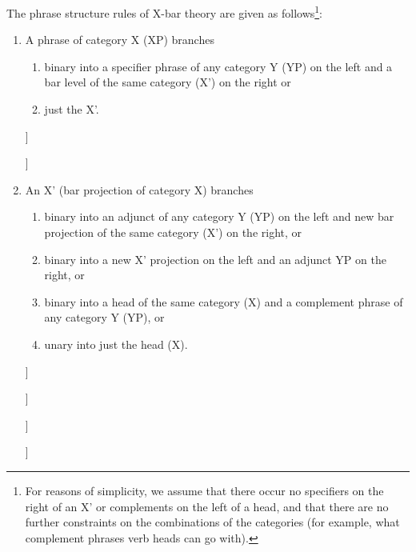\pagebreak
The phrase structure rules of X-bar theory are given as follows\footnote{For reasons of simplicity, we assume that there occur no specifiers on the right of an X' or complements on the left of a head, and that there are no further constraints on the combinations of the categories (for example, what complement phrases verb heads can go with).}:
\begin{enumerate}[label=\textbullet]
\item A phrase of category X (XP) branches\\[-1.25\baselineskip]
\begin{enumerate}[label={--}]\itemsep0pt
	\item binary into a specifier phrase of any category Y (YP) on the left and a bar level of the same category (X') on the right or
	\item just the X'.
\end{enumerate}
\begin{forest}
	[XP [YP] [X'] ]
\end{forest}
\hspace{1cm}
\begin{forest}
	[XP [X'] ]
\end{forest}

\item An X' (bar projection of category X) branches\\[-1.25\baselineskip]
\begin{enumerate}[label={--}]\itemsep0pt
	\item binary into an adjunct of any category Y (YP) on the left and new bar projection of the same category (X') on the right, or
	\item binary into a new X' projection on the left and an adjunct YP on the right, or
	\item binary into a head of the same category (X) and a complement phrase of any category Y (YP), or
	\item unary into just the head (X).
\end{enumerate}
\begin{forest}
	[X' [YP] [X'] ]
\end{forest}
\hspace{1cm}
\begin{forest}
	[X' [X'] [YP] ]
\end{forest}
\hspace{1cm}
\begin{forest}
	[X' [X] [YP] ]
\end{forest}
\hspace{1cm}
\begin{forest}
	[X' [X] ]
\end{forest}


\end{enumerate}
